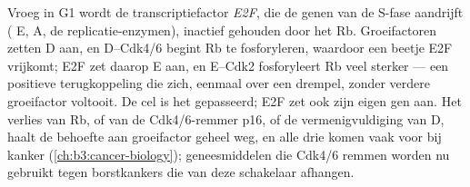 \begin{proposition}\label{prop:b3:cell-cycle-apoptosis:rb}
Vroeg in G1 wordt de transcriptiefactor \emph{E2F}, die de genen van de
S-fase aandrijft ( E,  A, de replicatie-enzymen),
inactief gehouden door het \emph{} Rb.
Groeifactoren zetten  D aan, en  D--Cdk4/6 begint Rb te
fosforyleren, waardoor een beetje E2F vrijkomt; E2F zet daarop 
E aan, en  E--Cdk2 fosforyleert Rb veel sterker --- een positieve
terugkoppeling die zich, eenmaal over een drempel, zonder verdere
groeifactor voltooit. De cel is het  gepasseerd; E2F zet
ook zijn eigen gen aan. Het verlies van Rb, of van de Cdk4/6-remmer
p16, of de vermenigvuldiging van  D, haalt de behoefte aan
groeifactor geheel weg, en alle drie komen vaak voor bij kanker
(\cref{ch:b3:cancer-biology}); geneesmiddelen die Cdk4/6 remmen worden
nu gebruikt tegen borstkankers die van deze schakelaar afhangen.
\end{proposition}

